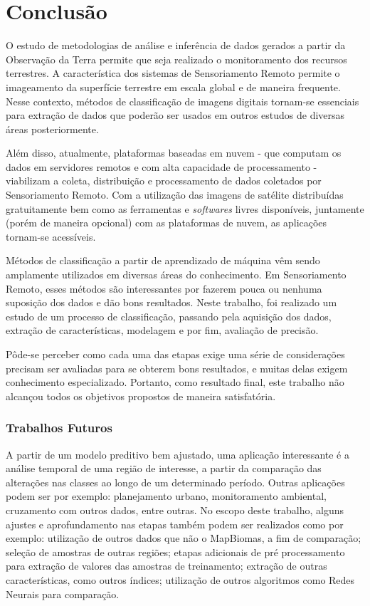 \chapter{Conclusão}\label{conclusuxe3o}

    O estudo de metodologias de análise e inferência de dados gerados a
partir da Observação da Terra permite que seja realizado o monitoramento
dos recursos terrestres. A característica dos sistemas de Sensoriamento
Remoto permite o imageamento da superfície terrestre em escala global e
de maneira frequente. Nesse contexto, métodos de classificação de
imagens digitais tornam-se essenciais para extração de dados que poderão
ser usados em outros estudos de diversas áreas posteriormente.

    Além disso, atualmente, plataformas baseadas em nuvem - que computam
os dados em servidores remotos e com alta capacidade de processamento -
viabilizam a coleta, distribuição e processamento de dados coletados por
Sensoriamento Remoto. Com a utilização das imagens de satélite
distribuídas gratuitamente bem como as ferramentas e \emph{softwares}
livres disponíveis, juntamente (porém de maneira opcional) com as
plataformas de nuvem, as aplicações tornam-se acessíveis.

    Métodos de classificação a partir de aprendizado de máquina vêm sendo
amplamente utilizados em diversas áreas do conhecimento. Em
Sensoriamento Remoto, esses métodos são interessantes por fazerem pouca
ou nenhuma suposição dos dados e dão bons resultados. Neste trabalho,
foi realizado um estudo de um processo de classificação, passando pela
aquisição dos dados, extração de características, modelagem e por fim,
avaliação de precisão.

    Pôde-se perceber como cada uma das etapas exige uma série de
considerações precisam ser avaliadas para se obterem bons resultados, e
muitas delas exigem conhecimento especializado. Portanto, como resultado
final, este trabalho não alcançou todos os objetivos propostos de
maneira satisfatória.

\subsection{Trabalhos Futuros}\label{trabalhos-futuros}

    A partir de um modelo preditivo bem ajustado, uma aplicação
interessante é a análise temporal de uma região de interesse, a partir
da comparação das alterações nas classes ao longo de um determinado
período. Outras aplicações podem ser por exemplo: planejamento urbano,
monitoramento ambiental, cruzamento com outros dados, entre outras. No
escopo deste trabalho, alguns ajustes e aprofundamento nas etapas também
podem ser realizados como por exemplo: utilização de outros dados que
não o MapBiomas, a fim de comparação; seleção de amostras de outras
regiões; etapas adicionais de pré processamento para extração de valores
das amostras de treinamento; extração de outras características, como
outros índices; utilização de outros algoritmos como Redes Neurais para
comparação.
